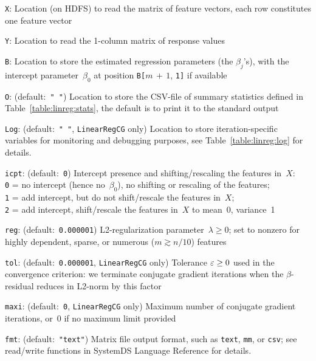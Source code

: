 \smallskip
{}
\begin{Description}
\item[{\tt X}:]
Location (on HDFS) to read the matrix of feature vectors, each row constitutes
one feature vector
\item[{\tt Y}:]
Location to read the 1-column matrix of response values
\item[{\tt B}:]
Location to store the estimated regression parameters (the $\beta_j$'s), with the
intercept parameter~$\beta_0$ at position {\tt B[}$m\,{+}\,1$, {\tt 1]} if available
\item[{\tt O}:] (default:\mbox{ }{\tt " "})
Location to store the CSV-file of summary statistics defined in
Table~\ref{table:linreg:stats}, the default is to print it to the standard output
\item[{\tt Log}:] (default:\mbox{ }{\tt " "}, {\tt LinearRegCG} only)
Location to store iteration-specific variables for monitoring and debugging purposes,
see Table~\ref{table:linreg:log} for details.
\item[{\tt icpt}:] (default:\mbox{ }{\tt 0})
Intercept presence and shifting/rescaling the features in~$X$:\\
{\tt 0} = no intercept (hence no~$\beta_0$), no shifting or rescaling of the features;\\
{\tt 1} = add intercept, but do not shift/rescale the features in~$X$;\\
{\tt 2} = add intercept, shift/rescale the features in~$X$ to mean~0, variance~1
\item[{\tt reg}:] (default:\mbox{ }{\tt 0.000001})
L2-regularization parameter~\mbox{$\lambda\geq 0$}; set to nonzero for highly dependent,
sparse, or numerous ($m \gtrsim n/10$) features
\item[{\tt tol}:] (default:\mbox{ }{\tt 0.000001}, {\tt LinearRegCG} only)
Tolerance \mbox{$\varepsilon\geq 0$} used in the convergence criterion: we terminate conjugate
gradient iterations when the $\beta$-residual reduces in L2-norm by this factor
\item[{\tt maxi}:] (default:\mbox{ }{\tt 0}, {\tt LinearRegCG} only)
Maximum number of conjugate gradient iterations, or~0 if no maximum
limit provided
\item[{\tt fmt}:] (default:\mbox{ }{\tt "text"})
Matrix file output format, such as {\tt text}, {\tt mm}, or {\tt csv};
see read/write functions in SystemDS Language Reference for details.
\end{Description}


